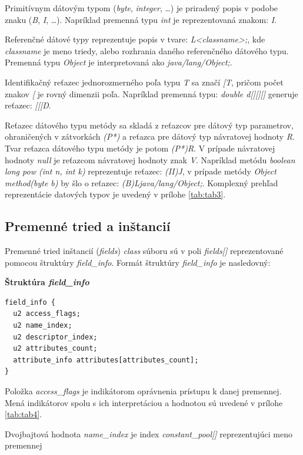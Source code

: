 \documentclass[11pt,final,oneside]{fithesis}
\newenvironment{example}[1]
{
\vspace{5mm}
\noindent\textbf{#1}
\vspace{1mm}
}
{
\vspace{5mm}
}
\begin{document}
Primitívnym dátovým typom (\textit{byte}, \textit{integer}, …) je priradený
popis v podobe znaku (\textit{B}, \textit{I}, …). Napríklad premenná typu
\textit{int} je reprezentovaná znakom: \textit{I}.

Referenčné dátové typy reprezentuje popis v tvare: \textit{L<classname>;}, kde 
\textit{classname} je meno triedy, alebo rozhrania daného referenčného
dátového typu. Premenná typu \textit{Object} je interpretovaná ako
\textit{java/lang/Object;}. 

Identifikačný reťazec jednorozmerného poľa typu \textit{T} sa značí
\textit{[T}, pričom počet znakov \textit{[} je rovný dimenzii poľa. Napríklad
premenná typu: \textit{double d[][][]} generuje reťazec: \textit{[[[D}.

Reťazec dátového typu metódy sa skladá z reťazcov pre dátový typ parametrov,
ohraničených v zátvorkách \textit{(P*)} a reťazca pre dátový typ návratovej
hodnoty \textit{R}. Tvar reťazca dátového typu metódy je potom \textit{(P*)R}.
V prípade návratovej hodnoty \textit{null} je reťazcom návratovej hodnoty znak
\textit{V}. Napríklad metódu \textit{boolean long pow (int n, int k)}
reprezentuje reťazec: \textit{(II)J}, v prípade metódy
\textit{Object method(byte b)} by šlo o reťazec:
\textit{(B)Ljava/lang/Object;}. Komplexný prehľad reprezentácie datových typov
je uvedený v prílohe \ref{tab:tab3}.

\subsection{Premenné tried a inštancií}
\label{sec:fields}
Premenné tried inštancií (\textit{fields}) \textit{class} súboru sú v poli
\textit{fields[]} reprezentované pomocou štruktúry \textit{field\_info}.
Formát štruktúry \textit{field\_info} je nasledovný:

\begin{example}{Štruktúra \textit{field\_info}}
\begin{verbatim}
field_info {
  u2 access_flags;
  u2 name_index;
  u2 descriptor_index;
  u2 attributes_count;
  attribute_info attributes[attributes_count];
}
\end{verbatim}
\end{example}

Položka \textit{access\_flags} je indikátorom oprávnenia prístupu k danej
premennej. Mená indikátorov spolu s ich interpretáciou a hodnotou sú uvedené v
prílohe \ref{tab:tab4}.
     
Dvojbajtová hodnota \textit{name\_index} je index \textit{constant\_pool[]}
reprezentujúci meno premennej
\end{document}
